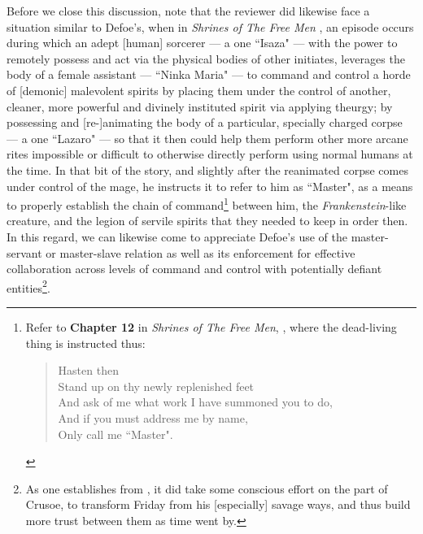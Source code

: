\documentclass[a4paper]{article}
\begin{document}
Before we close this discussion, note that the reviewer did likewise face a situation similar to Defoe's, when in \textit{Shrines of The Free Men} \cite{shrinesjwl}, an episode occurs during which an adept [human] sorcerer --- a one ``Isaza" --- with the power to remotely possess and act via the physical bodies of other initiates, leverages the body of a female assistant --- ``Ninka Maria" --- to command and control a horde of [demonic] malevolent spirits by placing them under the control of another, cleaner, more powerful and divinely instituted spirit via applying theurgy; by possessing and [re-]animating the body of a particular, specially charged corpse --- a one ``Lazaro" --- so that it then could help them perform other more arcane rites impossible or difficult to otherwise directly perform using normal humans at the time. In that bit of the story, and slightly after the reanimated corpse comes under control of the mage, he instructs it to refer to him as ``Master", as a means to properly establish the chain of command\footnote{Refer to \textbf{Chapter 12} in \textit{Shrines of The Free Men},  \cite{shrinesjwl}, where the dead-living thing is instructed thus:


\noindent
\begin{minipage}{1\textwidth}
\vspace{1em}
\begin{quotation}
{\ttfamily

Hasten then\\
Stand up on thy newly replenished feet\\
And ask of me what work I have summoned you to do,\\
And if you must address me by name,\\
Only call me ``Master".


}
\end{quotation}
\vspace{1em}
\end{minipage}


 } between him, the \textit{Frankenstein}-like creature, and the legion of servile spirits that they needed to keep in order then. In this regard, we can likewise come to appreciate Defoe's use of the master-servant or master-slave relation as well as its enforcement for effective collaboration across levels of command and control with potentially defiant entities\footnote{As one establishes from \cite{Defoe2007}, it did take some conscious effort on the part of Crusoe, to transform Friday from his [especially] savage ways, and thus build more trust between them as time went by.}.
\end{document}
